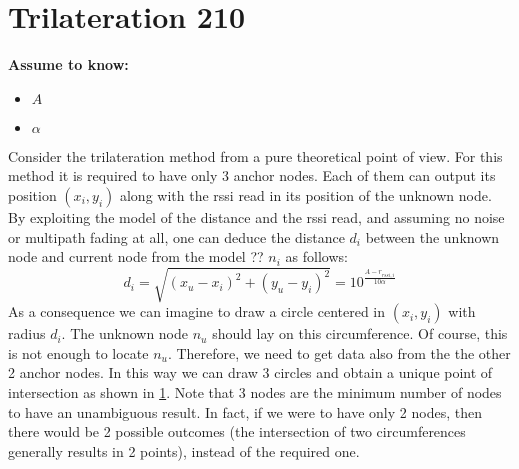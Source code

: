 \documentclass[12pt,twoside]{report}
\begin{document}
\clearpage
\section{Trilateration 210}

  \begin{center}
  \textbf{Assume to know:}
  \begin{itemize}
    \centering
    \item $A$
    \item $\alpha$
  \end{itemize}
  \end{center}
Consider the trilateration method from a pure theoretical point of view. For this method it is required to have only 3 anchor nodes. Each of them can output its position $(x_i,y_i)$ along with the rssi read in its position of the unknown node. By exploiting the model of the distance and the rssi read, and assuming no noise or multipath fading at all, one can deduce the distance $d_i$ between the unknown node and current node from the model ?? $n_i$ as follows:  
\begin{equation}
    d_i=\sqrt{(x_u-x_i)^2+(y_u-y_i)^2}=10^{\frac{A-r_{rssi,i}}{10\alpha}}    
\end{equation}
As a consequence we can imagine to draw a circle centered in $(x_i,y_i)$ with radius $d_i$. The unknown node $n_u$ should lay on this circumference. Of course, this is not enough to locate $n_u$. Therefore, we need to get data also from the the other 2 anchor nodes. In this way we can draw 3 circles and obtain a unique point of intersection as shown in \ref{fig:trilOK}. Note that 3 nodes are the minimum number of nodes to have an unambiguous result. In fact, if we were to have only 2 nodes, then there would be 2 possible outcomes (the intersection of two circumferences generally results in 2 points), instead of the required one.
\begin{figure}
    \centering
    \caption{}
    \label{fig:trilOK}
\end{figure}
\end{document}
